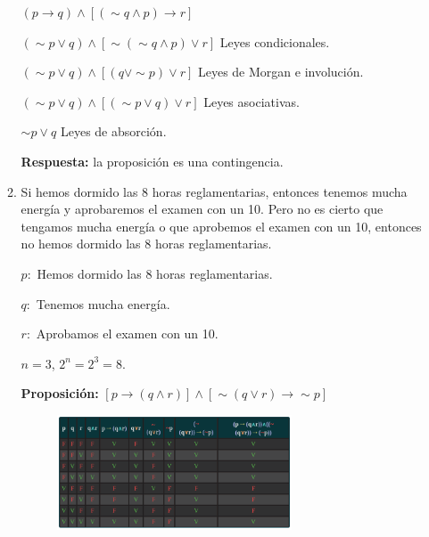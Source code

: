 \documentclass[12pt]{article}
\begin{document}
\begin{itemize}
\begin{enumerate}
                        \par{\large$(p \longrightarrow q) \wedge [(\sim q \wedge p) \longrightarrow r]$} \vspace{0.5cm}
                        \par$(\sim p \vee q) \wedge [\sim (\sim q \wedge p) \vee r]$ {\footnotesize Leyes condicionales.}
                        \par$(\sim p \vee q) \wedge [(q \vee \sim p) \vee r]$ {\footnotesize Leyes de Morgan e involución.}
                        \par$(\sim p \vee q) \wedge [(\sim p \vee q) \vee r]$ {\footnotesize Leyes asociativas.}
                        \par$\sim p \vee q$ {\footnotesize Leyes de absorción.} \vspace{0.5cm}
                        \par\textbf{Respuesta: } la proposición es una contingencia. \vspace{0.5cm}

                        
                    \newpage
                    \item Si hemos dormido las 8 horas reglamentarias, entonces tenemos mucha energía y aprobaremos el examen con un 10. Pero no es cierto que tengamos mucha energía o que aprobemos el examen con un 10, entonces no hemos dormido las 8 horas reglamentarias.
                        \par$p:$ Hemos dormido las 8 horas reglamentarias.
                        \par$q:$ Tenemos mucha energía.
                        \par$r:$ Aprobamos el examen con un 10.
                        \par$n = 3$, $2^n = 2^3 = 8.$ \vspace{0.5cm}
                        \par\textbf{Proposición: }$[p \longrightarrow (q \wedge r)] \wedge [\sim (q \vee r) \longrightarrow \sim p]$\vspace{0.5cm}

                        \begin{figure}[!h]
                            \centering
                            \includegraphics[width=0.7\textwidth]{Img/Tarea8_a_ej2.png}
                        \end{figure} \vspace{0.5cm}


\end{enumerate}
\end{itemize}
\end{document}
